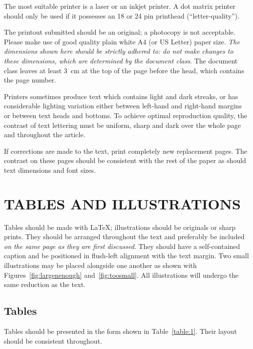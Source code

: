 \documentclass[fleqn,12pt,twoside]{article}
\begin{document}
The most suitable printer is a laser or an inkjet printer. A dot
matrix printer should only be used if it possesses an 18 or 24 pin
printhead (``letter-quality'').

The printout submitted should be an original; a photocopy is not
acceptable. Please make use of good quality plain white A4 (or US
Letter) paper size. {\em The dimensions shown here should be strictly
adhered to: do not make changes to these dimensions, which are
determined by the document class}. The document class leaves at least
3~cm at the top of the page before the head, which contains the page
number.

Printers sometimes produce text which contains light and dark streaks,
or has considerable lighting variation either between left-hand and
right-hand margins or between text heads and bottoms. To achieve
optimal reproduction quality, the contrast of text lettering must be
uniform, sharp and dark over the whole page and throughout the article.

If corrections are made to the text, print completely new replacement
pages. The contrast on these pages should be consistent with the rest
of the paper as should text dimensions and font sizes.

\section{TABLES AND ILLUSTRATIONS}

Tables should be made with \LaTeX; illustrations should be originals or
sharp prints. They should be arranged throughout the text and
preferably be included {\em on the same page as they are first
discussed}. They should have a self-contained caption and be positioned
in flush-left alignment with the text margin. Two small illustrations
may be placed alongside one another as shown with
Figures~\ref{fig:largenenough} and~\ref{fig:toosmall}. All
illustrations will undergo the same reduction as the text.

\subsection{Tables}

Tables should be presented in the form shown in
Table~\ref{table:1}.  Their layout should be consistent
throughout.
\end{document}
